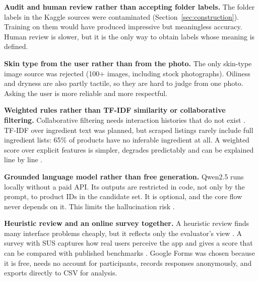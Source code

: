\textbf{Audit and human review rather than accepting folder labels.} The folder labels in the Kaggle sources were contaminated (Section~\ref{sec:construction}). Training on them would have produced impressive but meaningless accuracy. Human review is slower, but it is the only way to obtain labels whose meaning is defined.

\textbf{Skin type from the user rather than from the photo.} The only skin-type image source was rejected (100+ images, including stock photographs). Oiliness and dryness are also partly tactile, so they are hard to judge from one photo. Asking the user is more reliable and more respectful.

\textbf{Weighted rules rather than TF-IDF similarity or collaborative filtering.} Collaborative filtering needs interaction histories that do not exist \citep{ricci2022}. TF-IDF over ingredient text was planned, but scraped listings rarely include full ingredient lists: 65\% of products have no inferable ingredient at all. A weighted score over explicit features is simpler, degrades predictably and can be explained line by line \citep{roy2022}.

\textbf{Grounded language model rather than free generation.} Qwen2.5 \citep{qwen2024} runs locally without a paid API. Its outputs are restricted in code, not only by the prompt, to product IDs in the candidate set. It is optional, and the core flow never depends on it. This limits the hallucination risk \citep{ji2023}.

\textbf{Heuristic review and an online survey together.} A heuristic review finds many interface problems cheaply, but it reflects only the evaluator's view \citep{galavi2024}. A survey with SUS captures how real users perceive the app and gives a score that can be compared with published benchmarks \citep{vlachogianni2022}. Google Forms was chosen because it is free, needs no account for participants, records responses anonymously, and exports directly to CSV for analysis.
